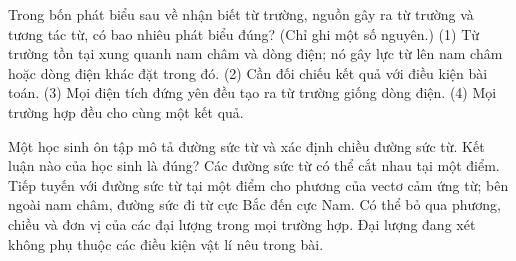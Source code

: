 \begin{ex}
Trong bốn phát biểu sau về nhận biết từ trường, nguồn gây ra từ trường và tương tác từ, có bao nhiêu phát biểu đúng? (Chỉ ghi một số nguyên.) (1) Từ trường tồn tại xung quanh nam châm và dòng điện; nó gây lực từ lên nam châm hoặc dòng điện khác đặt trong đó. (2) Cần đối chiếu kết quả với điều kiện bài toán. (3) Mọi điện tích đứng yên đều tạo ra từ trường giống dòng điện. (4) Mọi trường hợp đều cho cùng một kết quả.
\end{ex}

\begin{ex}
Một học sinh ôn tập mô tả đường sức từ và xác định chiều đường sức từ. Kết luận nào của học sinh là đúng?
\choice
{Các đường sức từ có thể cắt nhau tại một điểm.}
{\True Tiếp tuyến với đường sức từ tại một điểm cho phương của vectơ cảm ứng từ; bên ngoài nam châm, đường sức đi từ cực Bắc đến cực Nam.}
{Có thể bỏ qua phương, chiều và đơn vị của các đại lượng trong mọi trường hợp.}
{Đại lượng đang xét không phụ thuộc các điều kiện vật lí nêu trong bài.}
\end{ex}

